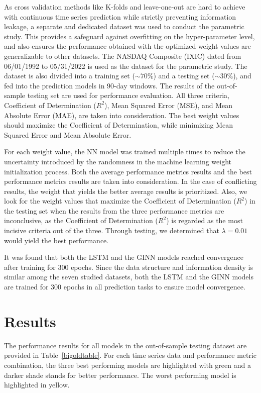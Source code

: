 As cross validation methods like K-folds and leave-one-out are hard to achieve with continuous time series prediction while strictly preventing information leakage, a separate and dedicated dataset was used to conduct the parametric study. This provides a safeguard against overfitting on the hyper-parameter level, and also ensures the performance obtained with the optimized weight values are generalizable to other datasets. The NASDAQ Composite (IXIC) dated from 06/01/1992 to 05/31/2022 is used as the dataset for the parametric study. The dataset is also divided into a training set ($\sim 70\%$) and a testing set ($\sim 30\%$), and fed into the prediction models in 90-day windows. The results of the out-of-sample testing set are used for performance evaluation. All three criteria, Coefficient of Determination ($R^2$), Mean Squared Error (MSE), and Mean Absolute Error (MAE), are taken into consideration. The best weight values should maximize the Coefficient of Determination, while minimizing Mean Squared Error and Mean Absolute Error. 

For each weight value, the NN model was trained multiple times to reduce the uncertainty introduced by the randomness in the machine learning weight initialization process. Both the average performance metrics results and the best performance metrics results are taken into consideration. In the case of conflicting results, the weight that yields the better average results is prioritized. Also, we look for the weight values that maximize the Coefficient of Determination ($R^2$) in the testing set when the results from the three performance metrics are inconclusive, as the Coefficient of Determination ($R^2$) is regarded as the most incisive criteria out of the three. Through testing, we determined that $\lambda=0.01$ would yield the best performance. 

It was found that both the LSTM and the GINN models reached convergence after training for 300 epochs. Since the data structure and information density is similar among the seven studied datasets, both the LSTM and the GINN models are trained for 300 epochs in all prediction tasks to ensure model convergence. 

\section{Results}
The performance results for all models in the out-of-sample testing dataset are provided in Table~\ref{bigoldtable}. For each time series data and performance metric combination, the three best performing models are highlighted with green and a darker shade stands for better performance. The worst performing model is highlighted in yellow. 

